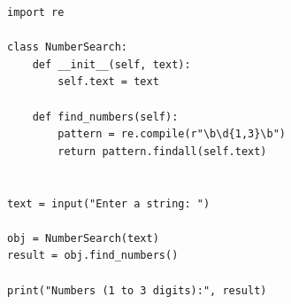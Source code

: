 \begin{verbatim}
import re

class NumberSearch:
    def __init__(self, text):
        self.text = text

    def find_numbers(self):
        pattern = re.compile(r"\b\d{1,3}\b")
        return pattern.findall(self.text)


text = input("Enter a string: ")

obj = NumberSearch(text)
result = obj.find_numbers()

print("Numbers (1 to 3 digits):", result)
\end{verbatim}